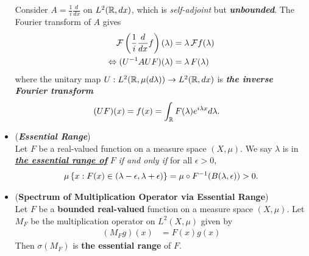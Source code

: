\documentclass[11pt]{article}
\begin{document}
\begin{itemize}
\begin{example}
Consider $A = \frac{1}{i}\frac{d}{dx}$ on $L^2({\mathbb R}, dx)$, which is \emph{self-adjoint} but \emph{\textbf{unbounded}}. The Fourier transform of $A$ gives
\begin{align*}
{\mathcal F}\left(\frac{1}{i}\frac{d}{dx}f\right)(\lambda) &= \lambda\,{\mathcal F} f(\lambda) \\
\Leftrightarrow (U^{-1}A UF)(\lambda) &= \lambda\, F(\lambda) 
\end{align*} where the unitary map $U: L^2({\mathbb R}, \mu(d\lambda)) \rightarrow  L^2({\mathbb R}, dx)$ is \emph{\textbf{the inverse Fourier transform}}
\begin{align*}
(UF)(x) = f(x) &=  \int_{{\mathbb R}} F(\lambda) e^{i \lambda x} d\lambda.
\end{align*}
\end{example}

\item \begin{definition} (\emph{\textbf{Essential Range}})\\
Let $F$ be a real-valued function on a measure space $(X, \mu)$.  We say $\lambda$ is in \underline{\emph{\textbf{the essential range of}}} $F$ \emph{if and only if} for all $\epsilon > 0$,
\begin{align*}
\mu\left\{x: F(x) \in (\lambda - \epsilon, \lambda + \epsilon)\right\} = \mu \circ F^{-1}(B(\lambda, \epsilon)) >0.
\end{align*} 
\end{definition}

\item \begin{proposition} (\textbf{Spectrum of Multiplication Operator via Essential Range}) \citep{reed1980methods}\\
Let $F$ be a \textbf{bounded real-valued} function on a measure  space $(X, \mu)$. Let $M_F$ be the multiplication operator on $L^2(X, \mu)$ given by 
\begin{align*}
(M_F g)(x) &= F(x) g(x)
\end{align*}
Then $\sigma(M_F)$ is \textbf{the essential range} of $F$. 
\end{proposition}
\end{itemize}
\end{document}
